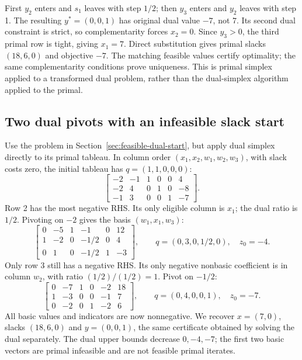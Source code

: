 \documentclass[11pt,a4paper]{article}
\begin{document}
First $y_2$ enters and $s_1$ leaves with step $1/2$; then $y_3$ enters and
$y_2$ leaves with step 1. The resulting $y^*=(0,0,1)$ has original dual
value $-7$, not $7$. Its second dual constraint is strict, so complementarity
forces $x_2=0$. Since $y_3>0$, the third primal row is tight, giving $x_1=7$.
Direct substitution gives primal slacks $(18,6,0)$ and objective $-7$.
The matching feasible values certify optimality; the same complementarity
conditions prove uniqueness. This is primal simplex applied to a transformed
dual problem, rather than the dual-simplex algorithm applied to the primal.

\subsection{Two dual pivots with an infeasible slack start}\label{sec:october-dual-path}
Use the problem in Section~\ref{sec:feasible-dual-start}, but apply dual simplex
directly to its primal tableau. In column order $(x_1,x_2,w_1,w_2,w_3)$,
with slack costs zero, the initial tableau has $q=(1,1,0,0,0)$:
\[
  \left[\begin{array}{rrrrr|r}
      -2&-1&1&0&0&4\\
      -2&4&0&1&0&-8\\
      -1&3&0&0&1&-7
    \end{array}\right].
\]
Row 2 has the most negative RHS. Its only eligible column is $x_1$;
the dual ratio is $1/2$. Pivoting on $-2$ gives the basis $(w_1,x_1,w_3)$:
\[
  \left[\begin{array}{rrrrr|r}
      0&-5&1&-1&0&12\\
      1&-2&0&-1/2&0&4\\
      0&1&0&-1/2&1&-3
    \end{array}\right],\qquad q=(0,3,0,1/2,0),\quad z_0=-4.
\]
Only row 3 still has a negative RHS. Its only negative nonbasic coefficient
is in column $w_2$, with ratio $(1/2)/(1/2)=1$. Pivot on $-1/2$:
\[
  \left[\begin{array}{rrrrr|r}
      0&-7&1&0&-2&18\\
      1&-3&0&0&-1&7\\
      0&-2&0&1&-2&6
    \end{array}\right],\qquad q=(0,4,0,0,1),\quad z_0=-7.
\]
All basic values and indicators are now nonnegative. We recover $x=(7,0)$,
slacks $(18,6,0)$ and $y=(0,0,1)$, the same certificate obtained by solving
the dual separately. The dual upper bounds decrease $0,-4,-7$; the first
two basic vectors are primal infeasible and are not feasible primal iterates.
\end{document}
